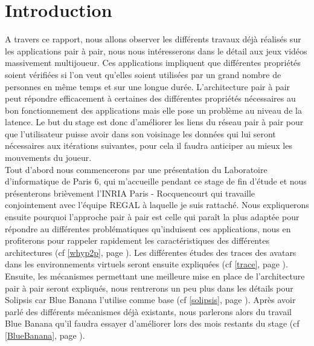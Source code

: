 \section{Introduction}
	A travers ce rapport, nous allons observer les différents travaux déjà réalisés sur les applications pair à pair, nous nous intéresserons dans le détail aux jeux vidéos massivement multijoueur. Ces applications impliquent que différentes propriétés soient vérifiées si l'on veut qu'elles soient utilisées par un grand nombre de personnes en même temps et sur une longue durée. L'architecture pair à pair peut répondre efficacement à certaines des différentes propriétés nécessaires au bon fonctionnement des applications mais elle pose un problème au niveau de la latence. Le but du stage est donc d'améliorer les liens du réseau pair à pair pour que l'utilisateur puisse avoir dans son voisinage les données qui lui seront nécessaires aux itérations suivantes, pour cela il faudra anticiper au mieux les mouvements du joueur.\\

	Tout d'abord nous commencerons par une présentation du Laboratoire d'informatique de Paris 6, qui m'accueille pendant ce stage de fin d'étude et nous présenterons brièvement l'INRIA Paris - Rocquencourt qui travaille conjointement avec l'équipe REGAL à laquelle je suis rattaché. Nous expliquerons ensuite pourquoi l'approche pair à pair est celle qui paraît la plus adaptée pour répondre au différentes problématiques qu'induisent ces applications, nous en profiterons pour rappeler rapidement les caractéristiques des différentes architectures (cf \ref{whyp2p}, page \pageref{whyp2p}). Les différentes études des traces des avatars dans les environnements virtuels seront ensuite expliquées (cf \ref{trace}, page \pageref{trace}). Ensuite, les mécanismes permettant une meilleure mise en place de l'architecture pair à pair seront expliqués, nous rentrerons un peu plus dans les détails pour Solipsis car Blue Banana l'utilise comme base (cf \ref{solipsis}, page \pageref{solipsis}). Après avoir parlé des différents mécanismes déjà existants, nous parlerons alors du travail Blue Banana qu'il faudra essayer d'améliorer lors des mois restants du stage (cf \ref{BlueBanana}, page \pageref{BlueBanana}).

